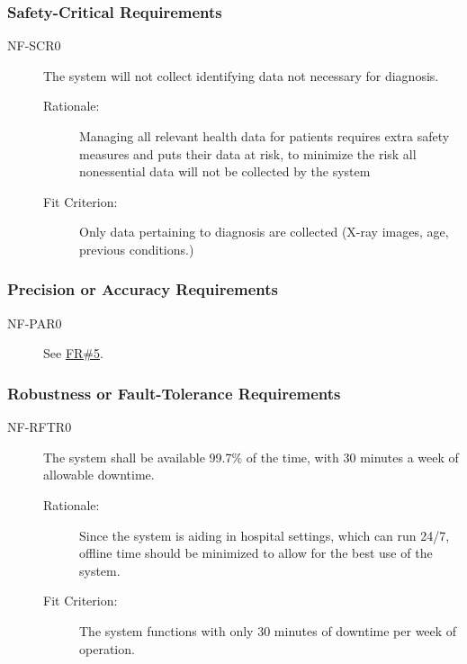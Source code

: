\documentclass[12pt]{article}
\begin{document}
\subsubsection{Safety-Critical Requirements}
\begin{description}
    \item[NF-SCR0]The system will not collect identifying data not necessary for diagnosis.
    \begin{description}
        \item[Rationale:] Managing all relevant health data for patients requires extra safety measures and puts their data at risk, to minimize the risk all nonessential data will not be collected by the system
        \item[Fit Criterion:] Only data pertaining to diagnosis are collected (X-ray images, age, previous conditions.)
    \end{description}
\end{description}

\subsubsection{Precision or Accuracy Requirements}
\begin{description}
    \item[NF-PAR0] See \hyperlink{FR5}{FR\#5}.
\end{description}

\subsubsection{Robustness or Fault-Tolerance Requirements}
\begin{description}
    \item[NF-RFTR0] The system shall be available 99.7\% of the time, with 30 minutes a week of allowable downtime.
    \begin{description}
        \item[Rationale:] Since the system is aiding in hospital settings, which can run 24/7, offline time should be minimized to allow for the best use of the system.
        \item[Fit Criterion:] The system functions with only 30 minutes of downtime per week of operation.
    \end{description}
\end{description}
\end{document}
